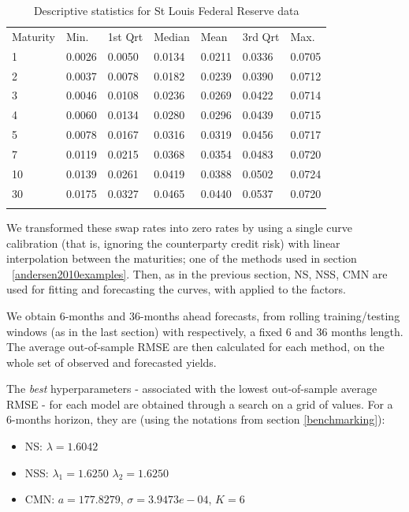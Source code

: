 \begin{table}
\begin{center}
\caption{Descriptive statistics for St Louis Federal Reserve data}
\label{tab:freddatatables1}       %
\begin{tabular}{lllllll}
\hline\noalign{\smallskip}
Maturity & Min. & 1st Qrt & Median & Mean & 3rd Qrt & Max.\\
\noalign{\smallskip}\hline\noalign{\smallskip}
  1  & 0.0026 & 0.0050  & 0.0134  & 0.0211  & 0.0336  & 0.0705\\
  2  & 0.0037 & 0.0078  & 0.0182  & 0.0239  & 0.0390  & 0.0712\\
  3  & 0.0046 & 0.0108  & 0.0236  & 0.0269  & 0.0422  & 0.0714\\
  4  & 0.0060 & 0.0134  & 0.0280  & 0.0296  & 0.0439  & 0.0715\\
  5  & 0.0078 & 0.0167  & 0.0316  & 0.0319  & 0.0456  & 0.0717\\
  7  & 0.0119 & 0.0215  & 0.0368  & 0.0354  & 0.0483  & 0.0720\\
  10 & 0.0139 & 0.0261  & 0.0419  & 0.0388  & 0.0502  & 0.0724\\
  30 & 0.0175 & 0.0327  & 0.0465  & 0.0440  & 0.0537  & 0.0720\\
\noalign{\smallskip}\hline
\end{tabular}
\end{center}
\end{table}

\medskip

We transformed these swap rates into zero rates by using a single curve calibration (that is, ignoring the counterparty credit risk) with linear interpolation between the maturities; one of the methods used in section ~\ref{andersen2010examples}. Then, as in the previous section, NS, NSS, CMN are used for fitting and forecasting the curves, with  applied to the factors. 

\medskip

We obtain 6-months and 36-months ahead forecasts,  from rolling training/testing windows (as in the last section) with respectively, a fixed  6 and 36 months length. The average out-of-sample RMSE are then calculated for each method, on the whole set of observed and forecasted yields. 

\medskip

The \textit{best} hyperparameters - associated with the lowest out-of-sample average RMSE - for each model are obtained through a search on a grid of values. For a 6-months horizon, they are (using the notations from section \ref{benchmarking}):
\begin{itemize}
\item NS: $\lambda = 1.6042$  
\item NSS: $\lambda_1 = 1.6250$ $\lambda_2 = 1.6250$
\item CMN: $a = 177.8279$, $\sigma = 3.9473e-04$, $K = 6$
\end{itemize}

